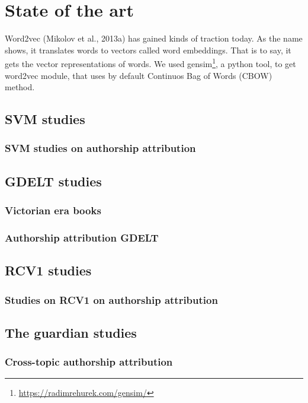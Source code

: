 \chapter{State of the art}

Word2vec (Mikolov et al., 2013a) has gained kinds of traction today. As the name shows, it translates words to vectors called word embeddings. That is to say, it gets the vector representations of words. We used gensim\footnote{\url{https://radimrehurek.com/gensim/}}, a python tool, to get word2vec module, that uses by default Continuos Bag of Words (CBOW) method.

\section{SVM studies}

\subsection{SVM studies on authorship attribution}

\section{GDELT studies}

\subsection{Victorian era books}

\subsection{Authorship attribution GDELT}

\section{RCV1 studies}

\subsection{Studies on RCV1 on authorship attribution}

\section{The guardian studies}

\subsection{Cross-topic authorship attribution}

